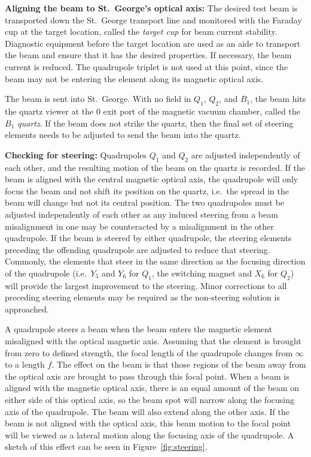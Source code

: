 \textbf{Aligning the beam to St.\ George's optical axis:}
The desired test beam is transported down the St.\ George transport line
and monitored with the Faraday cup at the target location, called the
\emph{target cup} for beam current stability. Diagnostic equipment
before the target location are used as an aide to transport the beam and
ensure that it has the desired properties. If necessary, the beam
current is reduced. The quadrupole triplet is not used at this point,
since the beam may not be entering the element along its magnetic
optical axis.

The beam is sent into St.\ George. With no field in $Q_1$, $Q_2$, and
$B_1$, the beam hits the quartz viewer at the 0\degree{} exit port of
the magnetic vacuum chamber, called the \emph{$B_1$ quartz}. If the beam
does not strike the quartz, then the final set of steering elements
needs to be adjusted to send the beam into the quartz.

\textbf{Checking for steering:}
Quadrupoles $Q_1$ and $Q_2$ are adjusted independently of each other,
and the resulting motion of the beam on the quartz is recorded. If the
beam is aligned with the central magnetic optical axis, the quadrupole
will only focus the beam and not shift its position on the quartz, i.e.\
the spread in the beam will change but not its central position. The two
quadrupoles must be adjusted independently of each other as any induced
steering from a beam misalignment in one may be counteracted by a
misalignment in the other quadrupole. If the beam is steered by either
quadrupole, the steering elements preceding the offending quadrupole
are adjusted to reduce that steering. Commonly, the elements that steer
in the same direction as the focusing direction of the quadrupole (i.e.\
$Y_5$ and $Y_6$ for $Q_1$, the switching magnet and $X_6$ for $Q_2$)
will provide the largest improvement to the steering. Minor corrections
to all preceding steering elements may be required as the non-steering
solution is approached.

A quadrupole steers a beam when the beam enters the magnetic element
misaligned with the optical magnetic axis. Assuming that the element is
brought from zero to defined strength, the focal length of the
quadrupole changes from $\infty$ to a length $f$. The effect on the beam
is that those regions of the beam away from the optical axis are brought
to pass through this focal point. When a beam is aligned with the
magnetic optical axis, there is an equal amount of the beam on either
side of this optical axis, so the beam spot will narrow along the
focusing axis of the quadrupole. The beam will also extend along the
other axis. If the beam is not aligned with the optical axis, this beam
motion to the focal point will be viewed as a lateral motion along the
focusing axis of the quadrupole. A sketch of this effect can be seen in
Figure~\ref{fig:steering}.

